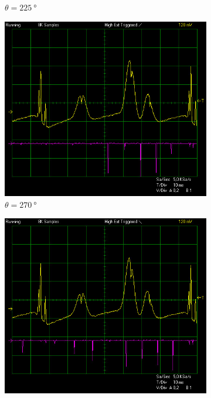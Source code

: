 \documentclass{article}
\begin{document}
\begin{figure}[h]
\begin{subfigure}[b]{0.3\textwidth}
        \caption{$\theta = \SI{225}{\degree}$}
        \label{fig:figure225}
    \end{subfigure}
    \begin{subfigure}[b]{0.3\textwidth}
        \centering
        \includegraphics[width=\linewidth]{Figures/3/270deg.jpg}
        \caption{$\theta = \SI{270}{\degree}$}
        \label{fig:figure270}
    \end{subfigure}
    \begin{subfigure}[b]{0.3\textwidth}
        \centering
        \includegraphics[width=\linewidth]{Figures/3/315deg.jpg}

\end{subfigure}
\end{figure}
\end{document}
